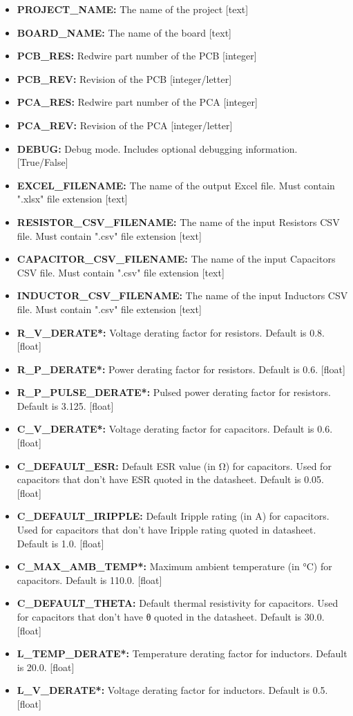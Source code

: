 \documentclass[12pt]{article}
\begin{document}
\begin{itemize}
    \item \textbf{PROJECT\_NAME:} The name of the project [text]
    \item \textbf{BOARD\_NAME:} The name of the board [text]
    \item \textbf{PCB\_RES:} Redwire part number of the PCB [integer]
    \item \textbf{PCB\_REV:} Revision of the PCB [integer/letter]
    \item \textbf{PCA\_RES:} Redwire part number of the PCA [integer]
    \item \textbf{PCA\_REV:} Revision of the PCA [integer/letter]
    \item \textbf{DEBUG:} Debug mode. Includes optional debugging information. [True/False]
    \item \textbf{EXCEL\_FILENAME:} The name of the output Excel file. Must contain ".xlsx" file extension [text]
    \item \textbf{RESISTOR\_CSV\_FILENAME:} The name of the input Resistors CSV file. Must contain ".csv" file extension [text]
    \item \textbf{CAPACITOR\_CSV\_FILENAME:} The name of the input Capacitors CSV file. Must contain ".csv" file extension [text]
    \item \textbf{INDUCTOR\_CSV\_FILENAME:} The name of the input Inductors CSV file. Must contain ".csv" file extension [text]
    \item \textbf{R\_V\_DERATE*:} Voltage derating factor for resistors. Default is 0.8. [float]
    \item \textbf{R\_P\_DERATE*:} Power derating factor for resistors. Default is 0.6. [float]
    \item \textbf{R\_P\_PULSE\_DERATE*:} Pulsed power derating factor for resistors. Default is 3.125. [float]
    \item \textbf{C\_V\_DERATE*:} Voltage derating factor for capacitors. Default is 0.6. [float]
    \item \textbf{C\_DEFAULT\_ESR:} Default ESR value (in Ω) for capacitors. Used for capacitors that don't have ESR quoted in the datasheet. Default is 0.05. [float]
    \item \textbf{C\_DEFAULT\_IRIPPLE:} Default Iripple rating (in A) for capacitors. Used for capacitors that don't have Iripple rating quoted in datasheet. Default is 1.0. [float]
    \item \textbf{C\_MAX\_AMB\_TEMP*:} Maximum ambient temperature (in °C) for capacitors. Default is 110.0. [float]
    \item \textbf{C\_DEFAULT\_THETA:} Default thermal resistivity for capacitors. Used for capacitors that don't have θ quoted in the datasheet. Default is 30.0. [float]
    \item \textbf{L\_TEMP\_DERATE*:} Temperature derating factor for inductors. Default is 20.0. [float]
    \item \textbf{L\_V\_DERATE*:} Voltage derating factor for inductors. Default is 0.5. [float]
\end{itemize}
\end{document}
